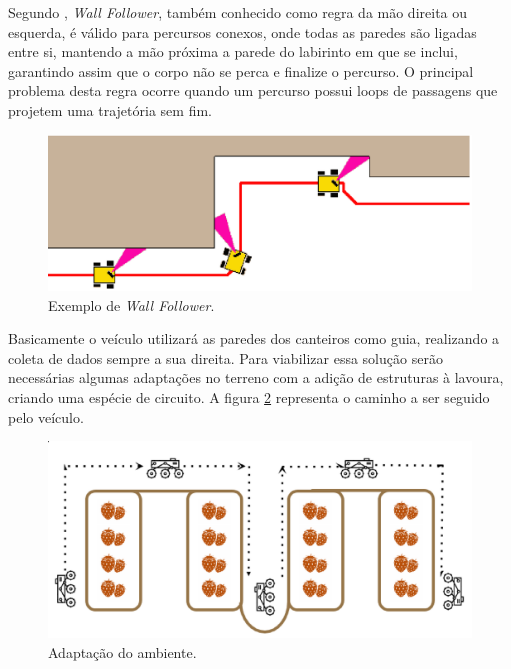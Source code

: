     Segundo \cite{huang2009}, \textit{Wall Follower},
    também conhecido como regra da mão direita ou esquerda, é válido para percursos conexos, onde todas as paredes são ligadas entre si, mantendo a mão próxima a parede do labirinto em
    que se inclui, garantindo assim que o corpo não se perca e finalize
    o percurso. O principal problema desta regra ocorre quando um percurso
    possui loops de passagens que projetem uma trajetória sem fim.

    \begin{figure}[!htbp]
    \begin{center}
    \includegraphics[width=.7\textwidth]{figuras/wallfollower.eps}
    \caption{\label{fig:wallfollower}Exemplo de \textit{Wall Follower}.}
    \end{center}
    \end{figure}

    \vfill
    \pagebreak

    Basicamente o veículo utilizará as paredes dos canteiros como guia, realizando a
    coleta de dados sempre a sua direita. Para viabilizar essa solução serão necessárias algumas adaptações no terreno com a adição de estruturas à lavoura, criando uma espécie de circuito. A figura \ref{fig:ambientadapt} representa o caminho a ser seguido pelo veículo.

    \begin{figure}[!htbp]
    \begin{center}
    \includegraphics[width=.7\textwidth]{figuras/adapt.eps}
    \caption{\label{fig:ambientadapt}Adaptação do ambiente.}
    \end{center}
    \end{figure}

